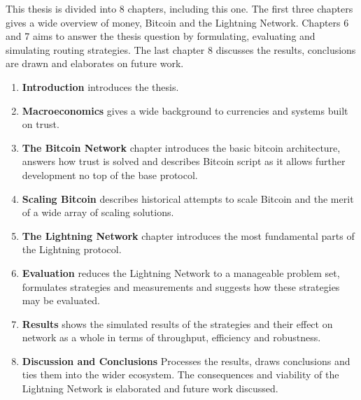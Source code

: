 This thesis is divided into 8 chapters, including this one. The first three chapters gives a wide overview of money, Bitcoin and the Lightning Network. Chapters 6 and 7 aims to answer the thesis question by formulating, evaluating and simulating routing strategies. The last chapter 8 discusses the results, conclusions are drawn and elaborates on future work.

\begin{enumerate}
	\item \textbf{Introduction} introduces the thesis.
	\item \textbf{Macroeconomics} gives a wide background to currencies and systems built on trust. 
	\item \textbf{The Bitcoin Network} chapter introduces the basic \gls{bitcoin} architecture, answers how trust is solved and describes Bitcoin script as it allows further development no top of the base protocol.
	\item \textbf{Scaling Bitcoin} describes historical attempts to scale Bitcoin and the merit of a wide array of scaling solutions.
	\item \textbf{The Lightning Network} chapter introduces the most fundamental parts of the Lightning protocol.
	\item \textbf{Evaluation} reduces the Lightning Network to a manageable problem set, formulates strategies and measurements and suggests how these strategies may be evaluated.
	\item \textbf{Results} shows the simulated results of the strategies and their effect on network as a whole in terms of throughput, efficiency and robustness.
	\item \textbf{Discussion and Conclusions} Processes the results, draws conclusions and ties them into the wider ecosystem. The consequences and viability of the Lightning Network is elaborated and future work discussed.
\end{enumerate}